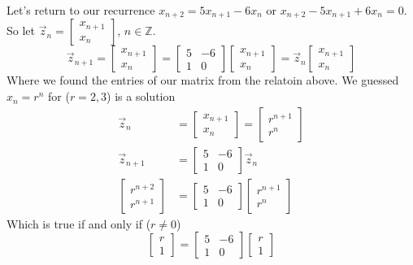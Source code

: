 \documentclass{article}
\theoremstyle{plain}
\theoremstyle{remark}
\newcommand{\Z}{{\mathbb Z}}
\begin{document}
Let's return to our recurrence
$x_{n+2} = 5x_{n+1} - 6x_n$ or $x_{n+2} - 5x_{n+1} + 6x_n = 0$.
So let $\vec{z}_n = \begin{bmatrix} x_{n+1}\\x_n \end{bmatrix}$, $n \in \Z$.
\[
	\vec{z}_{n+1} = \begin{bmatrix} x_{n+1} \\ x_n \end{bmatrix}
	= \begin{bmatrix} 5 & -6 \\ 1 & 0 \end{bmatrix}\begin{bmatrix} x_{n+1} \\ x_n\end{bmatrix}
	= \vec{z}_n\begin{bmatrix} x_{n+1} \\ x_n\end{bmatrix}
\]
Where we found the entries of our matrix from the relatoin above.
We guessed $x_n = r^n$ for ($r = 2,3$) is a solution
\begin{align*}
	\vec{z}_n &= \begin{bmatrix} x_{n+1}\\x_n \end{bmatrix}
	= \begin{bmatrix} r^{n+1}\\r^n \end{bmatrix}\\
	\vec{z}_{n+1} &= \begin{bmatrix} 5 & -6 \\ 1 & 0 \end{bmatrix} \vec{z}_n\\
	\begin{bmatrix} r^{n+2}\\r^{n+1} \end{bmatrix}
	 &= \begin{bmatrix} 5 & -6 \\ 1 & 0 \end{bmatrix} \begin{bmatrix} r^{n+1}\\r^n\end{bmatrix}
\end{align*}
Which is true if and only if ($r \neq 0$)
\[
	\begin{bmatrix} r \\ 1 \end{bmatrix} = \begin{bmatrix} 5 & -6 \\ 1 & 0 \end{bmatrix}
	\begin{bmatrix} r \\ 1 \end{bmatrix}
\]
\end{document}
